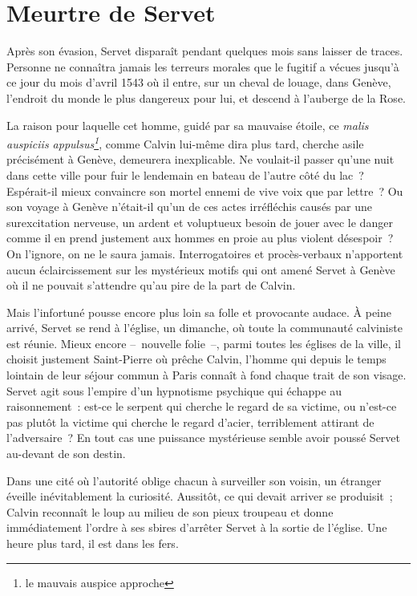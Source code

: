 \documentclass[french,twoside]{book} %
\newcommand\foreign[1]{\emph{#1}}
\newcommand\chapteropen{} %
\newcommand\chaptercont{} %
\begin{document}
\chapteropen

\chapter[{Meurtre de Servet}]{Meurtre de Servet}
\renewcommand{\leftmark}{Meurtre de Servet}


\chaptercont
\noindent Après son évasion, Servet disparaît pendant quelques mois sans laisser de traces. Personne ne connaîtra jamais les terreurs morales que le fugitif a vécues jusqu’à ce jour du mois d’avril 1543 où il entre, sur un cheval de louage, dans Genève, l’endroit du monde le plus dangereux pour lui, et descend à l’auberge de la Rose.\par
La raison pour laquelle cet homme, guidé par sa mauvaise étoile, ce \foreign{malis auspiciis appulsus\footnote{le mauvais auspice approche}}, comme Calvin lui-même dira plus tard, cherche asile précisément à Genève, demeurera inexplicable. Ne voulait-il passer qu’une nuit dans cette ville pour fuir le lendemain en bateau de l’autre côté du lac ? Espérait-il mieux convaincre son mortel ennemi de vive voix que par lettre ? Ou son voyage à Genève n’était-il qu’un de ces actes irréfléchis causés par une surexcitation nerveuse, un ardent et voluptueux besoin de jouer avec le danger comme il en prend justement aux hommes en proie au plus violent désespoir ? On l’ignore, on ne le saura jamais. Interrogatoires et procès-verbaux n’apportent aucun éclaircissement sur les mystérieux motifs qui ont amené Servet à Genève où il ne pouvait s’attendre qu’au pire de la part de Calvin.\par
Mais l’infortuné pousse encore plus loin sa folle et provocante audace. À peine arrivé, Servet se rend à l’église, un dimanche, où toute la communauté calviniste est réunie. Mieux encore – nouvelle folie –, parmi toutes les églises de la ville, il choisit justement Saint-Pierre où prêche Calvin, l’homme qui depuis le temps lointain de leur séjour commun à Paris connaît à fond chaque trait de son visage. Servet agit sous l’empire d’un hypnotisme psychique qui échappe au raisonnement : est-ce le serpent qui cherche le regard de sa victime, ou n’est-ce pas plutôt la victime qui cherche le regard d’acier, terriblement attirant de l’adversaire ? En tout cas une puissance mystérieuse semble avoir poussé Servet au-devant de son destin.\par
Dans une cité où l’autorité oblige chacun à surveiller son voisin, un étranger éveille inévitablement la curiosité. Aussitôt, ce qui devait arriver se produisit ; Calvin reconnaît le loup au milieu de son pieux troupeau et donne immédiatement l’ordre à ses sbires d’arrêter Servet à la sortie de l’église. Une heure plus tard, il est dans les fers.\par
\end{document}
